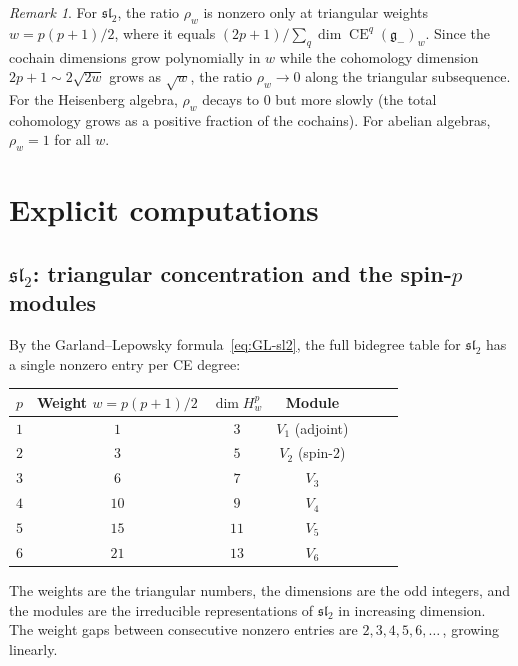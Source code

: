 \documentclass[11pt,reqno]{amsart}
\theoremstyle{plain}
\theoremstyle{definition}
\theoremstyle{remark}
\newtheorem{remark}[theorem]{Remark}
\DeclareMathOperator{\CE}{CE}
\newcommand{\fg}{\mathfrak{g}}
\newcommand{\gminus}{\fg_{-}}
\begin{document}
\begin{remark}\label{rem:rho-asymptotic}
 For $\mathfrak{sl}_2$, the ratio $\rho_w$ is nonzero only at triangular
 weights $w = p(p+1)/2$, where it equals $(2p+1) / \sum_q \dim
 \CE^q(\gminus)_w$. Since the cochain dimensions grow polynomially in $w$
 while the cohomology dimension $2p+1 \sim 2\sqrt{2w}$ grows as
 $\sqrt{w}$, the ratio $\rho_w \to 0$ along the triangular subsequence.
 For the Heisenberg algebra, $\rho_w$ decays to $0$ but more slowly (the
 total cohomology grows as a positive fraction of the cochains). For
 abelian algebras, $\rho_w = 1$ for all $w$.
\end{remark}


\section{Explicit computations}
\label{sec:computations}

\subsection{$\mathfrak{sl}_2$: triangular concentration and the spin-$p$ modules}
\label{sec:sl2}

By the Garland--Lepowsky formula~\eqref{eq:GL-sl2}, the full bidegree table
for $\mathfrak{sl}_2$ has a single nonzero entry per CE degree:

\begin{center}
 \begin{tabular}{c|cccccc}
 \toprule
 $p$ & Weight $w = p(p+1)/2$ & $\dim H^p_w$ & Module \\
 \midrule
 $1$ & $1$ & $3$ & $V_1$ (adjoint) \\
 $2$ & $3$ & $5$ & $V_2$ (spin-$2$) \\
 $3$ & $6$ & $7$ & $V_3$ \\
 $4$ & $10$ & $9$ & $V_4$ \\
 $5$ & $15$ & $11$ & $V_5$ \\
 $6$ & $21$ & $13$ & $V_6$ \\
 \bottomrule
 \end{tabular}
\end{center}

\noindent
The weights are the triangular numbers, the dimensions are the odd integers,
and the modules are the irreducible representations of $\mathfrak{sl}_2$ in
increasing dimension. The weight gaps between consecutive nonzero entries
are $2, 3, 4, 5, 6, \ldots$\,, growing linearly.
\end{document}
